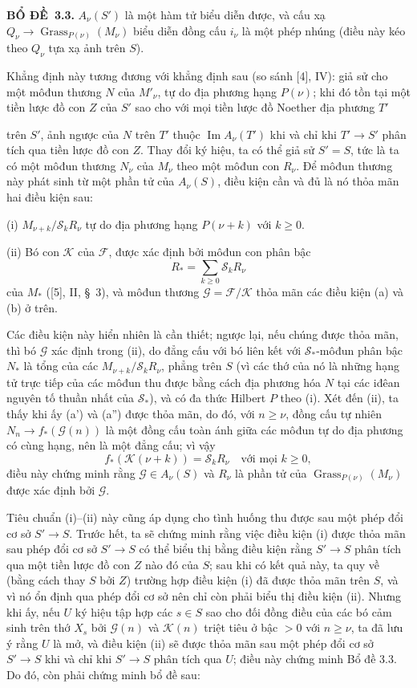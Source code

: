 \documentclass[11pt,twoside,openany]{book}
\numberwithin{equation}{section}
\newcommand{\src}[1]{%
  \phantomsection\hypertarget{src:\fgasourceid:#1}{}%
  \marginpar{\raggedleft\footnotesize\sffamily #1}%
}
\newcommand{\fgasourceid}{unset}
\newcommand{\result}[2]{\par\medskip\noindent\textbf{#1\if\relax\detokenize{#2}\relax\else\ #2\fi.}\quad}
\begin{document}
\result{BỔ ĐỀ}{3.3} $A_\nu(S')$ là một hàm tử biểu diễn được, và cấu xạ
$Q_\nu\longrightarrow\operatorname{Grass}_{P(\nu)}(M_\nu)$ biểu diễn đồng cấu
$i_\nu$ là một phép nhúng (điều này kéo theo $Q_\nu$ tựa xạ ảnh trên $S$).

Khẳng định này tương đương với khẳng định sau (so sánh [4], IV): giả sử cho
một môđun thương $N$ của $M'_\nu$, tự do địa phương hạng $P(\nu)$; khi đó tồn
tại một tiền lược đồ con $Z$ của $S'$ sao cho với mọi tiền lược đồ Noether địa
phương $T'$
\src{262}
trên $S'$, ảnh ngược của $N$ trên $T'$ thuộc
$\operatorname{Im}A_\nu(T')$ khi và chỉ khi $T'\longrightarrow S'$ phân tích
qua tiền lược đồ con $Z$. Thay đổi ký hiệu, ta có thể giả sử $S'=S$, tức là ta
có một môđun thương $N_\nu$ của $M_\nu$ theo một môđun con $R_\nu$. Để môđun
thương này phát sinh từ một phần tử của $A_\nu(S)$, điều kiện cần và đủ là nó
thỏa mãn hai điều kiện sau:

\medskip
\noindent (i) $M_{\nu+k}/\mathcal S_kR_\nu$ tự do địa phương hạng
$P(\nu+k)$ với $k\geq0$.

\smallskip
\noindent (ii) Bó con $\mathcal K$ của $\mathcal F$, được xác định bởi môđun
con phân bậc
\[
R_* =\sum_{k\geq0}\mathcal S_kR_\nu
\]
của $M_*$ ([5], II, \S~3), và môđun thương
$\mathcal G=\mathcal F/\mathcal K$ thỏa mãn các điều kiện (a) và (b) ở trên.

Các điều kiện này hiển nhiên là cần thiết; ngược lại, nếu chúng được thỏa mãn,
thì bó $\mathcal G$ xác định trong (ii), do đẳng cấu với bó liên kết với
$\mathcal S_*$-môđun phân bậc $N_*$ là tổng của các
$M_{\nu+k}/\mathcal S_kR_\nu$, phẳng trên $S$ (vì các thớ của nó là những hạng
tử trực tiếp của các môđun thu được bằng cách địa phương hóa $N$ tại các
iđêan nguyên tố thuần nhất của $\mathcal S_*$), và có đa thức Hilbert $P$ theo
(i). Xét đến (ii), ta
thấy khi ấy (a') và (a'') được thỏa mãn, do đó, với $n\geq\nu$, đồng cấu tự
nhiên $N_n\longrightarrow f_*(\mathcal G(n))$ là một đồng cấu toàn ánh giữa
các môđun tự do địa phương có cùng hạng, nên là một đẳng cấu; vì vậy
\[
f_*(\mathcal K(\nu+k))=\mathcal S_kR_\nu
\quad\text{với mọi $k\geq0$},
\]
điều này chứng minh rằng $\mathcal G\in A_\nu(S)$ và $R_\nu$ là phần tử của
$\operatorname{Grass}_{P(\nu)}(M_\nu)$ được xác định bởi $\mathcal G$.

Tiêu chuẩn (i)--(ii) này cũng áp dụng cho tình huống thu được sau một phép đổi
cơ sở $S'\longrightarrow S$. Trước hết, ta sẽ chứng minh rằng việc điều kiện
(i) được thỏa mãn sau phép đổi cơ sở $S'\longrightarrow S$ có thể biểu thị
bằng điều kiện rằng $S'\longrightarrow S$ phân tích qua một tiền lược đồ con
$Z$ nào đó của $S$; sau khi có kết quả này, ta quy về (bằng cách thay $S$ bởi
$Z$) trường hợp điều kiện (i) đã được thỏa mãn trên $S$, và vì nó ổn định qua
phép đổi cơ sở nên chỉ còn phải biểu thị điều kiện (ii). Nhưng khi ấy, nếu $U$
ký hiệu tập hợp các $s\in S$ sao cho đối đồng điều của các bó cảm sinh trên thớ
$X_s$ bởi $\mathcal G(n)$ và $\mathcal K(n)$ triệt tiêu ở bậc $>0$ với
$n\geq\nu$, ta đã lưu ý rằng $U$ là mở, và điều kiện (ii) sẽ được thỏa mãn sau
một phép đổi cơ sở $S'\longrightarrow S$ khi và chỉ khi
$S'\longrightarrow S$ phân tích qua $U$; điều này chứng minh Bổ đề 3.3. Do đó,
còn phải chứng minh bổ đề sau:
\end{document}
